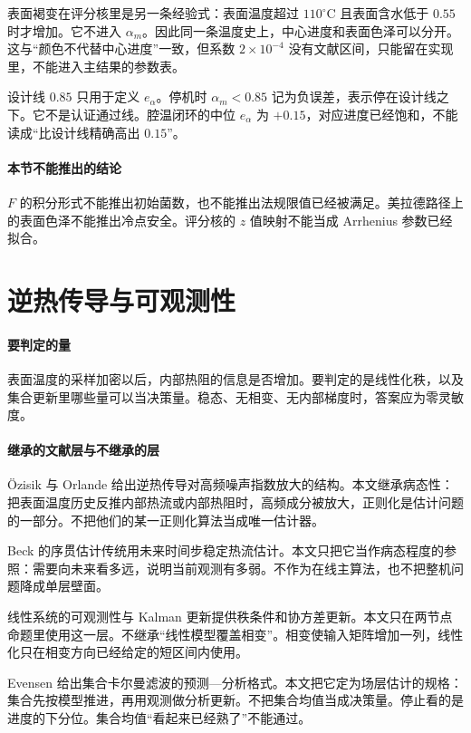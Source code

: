 表面褐变在评分核里是另一条经验式：表面温度超过 $110^\circ\mathrm{C}$ 且表面含水低于 $0.55$ 时才增加。它不进入 $\alpha_m$。因此同一条温度史上，中心进度和表面色泽可以分开。这与“颜色不代替中心进度”一致，但系数 $2\times 10^{-4}$ 没有文献区间，只能留在实现里，不能进入主结果的参数表。

设计线 $0.85$ 只用于定义 $e_\alpha$。停机时 $\alpha_m<0.85$ 记为负误差，表示停在设计线之下。它不是认证通过线。腔温闭环的中位 $e_\alpha$ 为 $+0.15$，对应进度已经饱和，不能读成“比设计线精确高出 $0.15$”。

\paragraph{本节不能推出的结论}
$F$ 的积分形式不能推出初始菌数，也不能推出法规限值已经被满足。美拉德路径上的表面色泽不能推出冷点安全。评分核的 $z$ 值映射不能当成 Arrhenius 参数已经拟合。

\section{逆热传导与可观测性}

\paragraph{要判定的量}
表面温度的采样加密以后，内部热阻的信息是否增加。要判定的是线性化秩，以及集合更新里哪些量可以当决策量。稳态、无相变、无内部梯度时，答案应为零灵敏度。

\paragraph{继承的文献层与不继承的层}
Özisik 与 Orlande 给出逆热传导对高频噪声指数放大的结构\cite{ozisik2000}。本文继承病态性：把表面温度历史反推内部热流或内部热阻时，高频成分被放大，正则化是估计问题的一部分。不把他们的某一正则化算法当成唯一估计器。

Beck 的序贯估计传统用未来时间步稳定热流估计。本文只把它当作病态程度的参照：需要向未来看多远，说明当前观测有多弱。不作为在线主算法，也不把整机问题降成单层壁面。

线性系统的可观测性与 Kalman 更新提供秩条件和协方差更新。本文只在两节点命题里使用这一层。不继承“线性模型覆盖相变”。相变使输入矩阵增加一列，线性化只在相变方向已经给定的短区间内使用。

Evensen 给出集合卡尔曼滤波的预测—分析格式\cite{evensen2003}。本文把它定为场层估计的规格：集合先按模型推进，再用观测做分析更新。不把集合均值当成决策量。停止看的是进度的下分位。集合均值“看起来已经熟了”不能通过。

